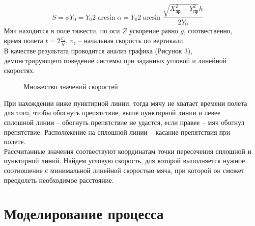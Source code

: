 \documentclass[a5paper, 10pt]{article}
\theoremstyle{definition}
\theoremstyle{plain}
\theoremstyle{remark}
\begin{document}
\begin{equation}
S = \phi Y_0 =  Y_0  2 \arcsin \alpha =  Y_0  2 \arcsin \frac{ \sqrt{ X_{\text{пр}}^2 + Y_{\text{пр}}^2} h}{2 Y_0}
\end{equation}
Мяч находится в поле тяжести, по оси $Z$ ускорение равно $g$, соотвественно, время полета $t = 2 \frac{v_z}{g}$, $v_z$ -- начальная скорость по вертикали.\\
В качестве результата проводится анализ графика (Рисунок 3), демонстрирующего поведение системы при заданных угловой и линейной скоростях.
\begin{figure}[!h]
             \caption{Множество значений скоростей}
\end{figure}
При нахождении ниже пунктирной линии, тогда мячу не хватает времени полета для того, чтобы обогнуть препятствие, выше пунктирной линии и левее сплошной линии -- обогнуть препятствие не удастся, если правее -- мяч обогнул препятствие. Расположение на сплошной линии -- касание препятствия при полете.\\
Рассчитанные значения соотвествуют координатам точки пересечения сплошной и пунктирной линий.
Найдем угловую скорость, для которой выполняется нужное соотношение с минимальной линейной скоростью мяча, при которой он сможет преодолеть необходимое расстояние.\\


\section{Моделирование процесса}
\end{document}
